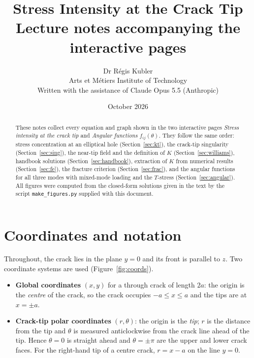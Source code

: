 \documentclass[11pt,a4paper]{article}
\title{Stress Intensity at the Crack Tip\\[4pt]\large Lecture notes accompanying the interactive pages}
\author{Dr R\'egis Kubler\\ \normalsize Arts et M\'etiers Institute of Technology\\[4pt] \small Written with the assistance of Claude Opus 5.5 (Anthropic)}
\date{October 2026}
\begin{document}
\maketitle

\begin{abstract}
These notes collect every equation and graph shown in the two interactive pages
\emph{Stress intensity at the crack tip} and \emph{Angular functions $f_{ij}(\theta)$}.
They follow the same order: stress concentration at an elliptical hole (Section~\ref{sec:kt}),
the crack-tip singularity (Section~\ref{sec:sing}), the near-tip field and the definition of $K$
(Section~\ref{sec:williams}), handbook solutions (Section~\ref{sec:handbook}), extraction of $K$
from numerical results (Section~\ref{sec:fe}), the fracture criterion (Section~\ref{sec:frac}),
and the angular functions for all three modes with mixed-mode loading and the $T$-stress
(Section~\ref{sec:angular}). All figures were computed from the closed-form solutions given in the
text by the script \texttt{make\_figures.py} supplied with this document.
\end{abstract}

\tableofcontents
\bigskip

\section{Coordinates and notation}\label{sec:coords}
Throughout, the crack lies in the plane $y=0$ and its front is parallel to $z$.
Two coordinate systems are used (Figure~\ref{fig:coords}).

\begin{itemize}
  \item \textbf{Global coordinates} $(x,y)$ for a through crack of length $2a$: the origin is the
  \emph{centre} of the crack, so the crack occupies $-a\le x\le a$ and the tips are at $x=\pm a$.
  \item \textbf{Crack-tip polar coordinates} $(r,\theta)$: the origin is the \emph{tip}; $r$ is the
  distance from the tip and $\theta$ is measured anticlockwise from the crack line ahead of the tip.
  Hence $\theta=0$ is straight ahead and $\theta=\pm\pi$ are the upper and lower crack faces. For the
  right-hand tip of a centre crack, $r=x-a$ on the line $y=0$.
\end{itemize}
\end{document}

